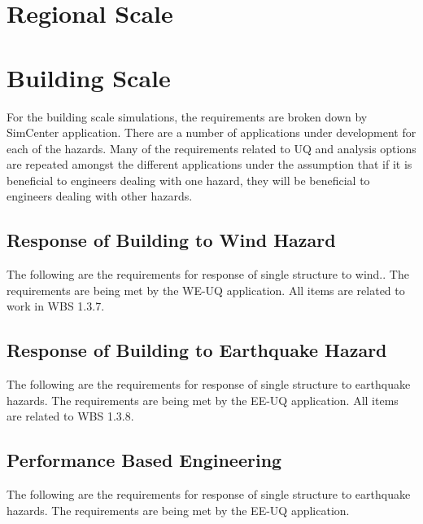\documentclass{simcenterdocumentation}
\begin{document}
\section{Regional Scale}


\section{Building Scale}

For the building scale simulations, the requirements are broken down by SimCenter application. There are a number of applications under development for each of the hazards. Many of the requirements related to UQ and analysis options are repeated amongst the different applications under the assumption that if it is beneficial to engineers dealing with one hazard, they will be beneficial to engineers dealing with other hazards.

\subsection{Response of Building to Wind Hazard}
The following are the requirements for response of single structure to wind.. The requirements are being met by the WE-UQ application. All items are related to work in WBS 1.3.7.

 

\subsection{Response of Building to Earthquake Hazard}
The following are the requirements for response of single structure to earthquake hazards. The requirements are being met by the EE-UQ application. All items are related to WBS 1.3.8.

 


\subsection{Performance Based Engineering}
The following are the requirements for response of single structure to earthquake hazards. The requirements are being met by the EE-UQ application.




\pagestyle{plain}
{
  \renewcommand{\thispagestyle}[1]{}	
  \printbibliography           
}
\end{document}
